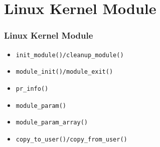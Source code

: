 \documentclass[aspectratio=169, xcolor=table, notheorems, hyperref={pdfpagelabels=false}]{beamer}
\begin{document}
\section{Linux Kernel Module}
\begin{frame}[fragile]
\frametitle{Linux Kernel Module}
\begin{itemize}
\item \texttt{init\_module()/cleanup\_module()}
\item \texttt{module\_init()/module\_exit()}
\item \texttt{pr\_info()}
\item \texttt{module\_param()}
\item \texttt{module\_param\_array()}
\item \texttt{copy\_to\_user()/copy\_from\_user()}
\end{itemize}
\end{frame}
\end{document}
